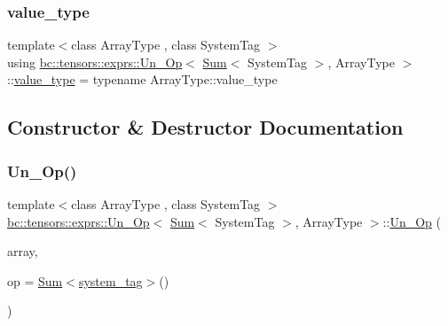 \subsubsection{\texorpdfstring{value\+\_\+type}{value\_type}}
{\footnotesize\ttfamily template$<$class Array\+Type , class System\+Tag $>$ \\
using \hyperlink{structbc_1_1tensors_1_1exprs_1_1Un__Op}{bc\+::tensors\+::exprs\+::\+Un\+\_\+\+Op}$<$ \hyperlink{structbc_1_1tensors_1_1exprs_1_1Sum}{Sum}$<$ System\+Tag $>$, Array\+Type $>$\+::\hyperlink{structbc_1_1Shape_3_010_01_4_a342cb50fc2de91d730a07750321bf986}{value\+\_\+type} =  typename Array\+Type\+::value\+\_\+type}



\subsection{Constructor \& Destructor Documentation}
\mbox{\label{structbc_1_1tensors_1_1exprs_1_1Un__Op_3_01Sum_3_01SystemTag_01_4_00_01ArrayType_01_4_af86e9a2543d2e1e5e94ae031a1c78107}} 
\subsubsection{\texorpdfstring{Un\+\_\+\+Op()}{Un\_Op()}}
{\footnotesize\ttfamily template$<$class Array\+Type , class System\+Tag $>$ \\
\hyperlink{structbc_1_1tensors_1_1exprs_1_1Un__Op}{bc\+::tensors\+::exprs\+::\+Un\+\_\+\+Op}$<$ \hyperlink{structbc_1_1tensors_1_1exprs_1_1Sum}{Sum}$<$ System\+Tag $>$, Array\+Type $>$\+::\hyperlink{structbc_1_1tensors_1_1exprs_1_1Un__Op}{Un\+\_\+\+Op} (\begin{DoxyParamCaption}\item[{Array\+Type}]{array,  }\item[{\hyperlink{structbc_1_1tensors_1_1exprs_1_1Sum}{Sum}$<$ \hyperlink{structbc_1_1tensors_1_1exprs_1_1Un__Op_3_01Sum_3_01SystemTag_01_4_00_01ArrayType_01_4_adcf344b839121a6264ce6c514c95f145}{system\+\_\+tag} $>$}]{op = {\ttfamily \hyperlink{structbc_1_1tensors_1_1exprs_1_1Sum}{Sum}$<$\hyperlink{structbc_1_1tensors_1_1exprs_1_1Un__Op_3_01Sum_3_01SystemTag_01_4_00_01ArrayType_01_4_adcf344b839121a6264ce6c514c95f145}{system\+\_\+tag}$>$()} }\end{DoxyParamCaption})\hspace{0.3cm}{\ttfamily [inline]}}



